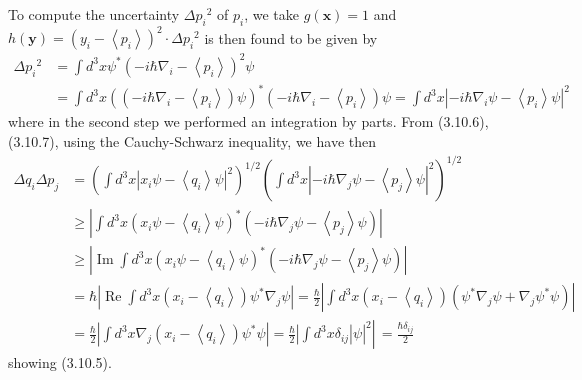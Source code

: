 \documentclass{article}
\begin{document}
To compute the uncertainty $\Delta p_{i}{ }^{2}$ of $p_{i}$, we take $g(\boldsymbol{x})=1$ and $h(\boldsymbol{y})=\left(y_{i}-\left\langle p_{i}\right\rangle\right)^{2} \cdot \Delta p_{i}{ }^{2}$ is then found to be given by
$$
\begin{align*}
\Delta p_{i}{ }^{2} & =\int d^{3} x \psi^{*}\left(-i \hbar \nabla_{i}-\left\langle p_{i}\right\rangle\right)^{2} \psi  \tag{3.10.7}\\
& =\int d^{3} x\left(\left(-i \hbar \nabla_{i}-\left\langle p_{i}\right\rangle\right) \psi\right)^{*}\left(-i \hbar \nabla_{i}-\left\langle p_{i}\right\rangle\right) \psi=\int d^{3} x\left|-i \hbar \nabla_{i} \psi-\left\langle p_{i}\right\rangle \psi\right|^{2}
\end{align*}
$$
where in the second step we performed an integration by parts. From (3.10.6), (3.10.7), using the Cauchy-Schwarz inequality, we have then
$$
\begin{align*}
\Delta q_{i} \Delta p_{j} & =\left(\int d^{3} x\left|x_{i} \psi-\left\langle q_{i}\right\rangle \psi\right|^{2}\right)^{1 / 2}\left(\int d^{3} x\left|-i \hbar \nabla_{j} \psi-\left\langle p_{j}\right\rangle \psi\right|^{2}\right)^{1 / 2}  \tag{3.10.8}\\
& \geq\left|\int d^{3} x\left(x_{i} \psi-\left\langle q_{i}\right\rangle \psi\right)^{*}\left(-i \hbar \nabla_{j} \psi-\left\langle p_{j}\right\rangle \psi\right)\right| \\
& \geq\left|\operatorname{Im} \int d^{3} x\left(x_{i} \psi-\left\langle q_{i}\right\rangle \psi\right)^{*}\left(-i \hbar \nabla_{j} \psi-\left\langle p_{j}\right\rangle \psi\right)\right| \\
& =\hbar\left|\operatorname{Re} \int d^{3} x\left(x_{i}-\left\langle q_{i}\right\rangle\right) \psi^{*} \nabla_{j} \psi\right|=\frac{\hbar}{2}\left|\int d^{3} x\left(x_{i}-\left\langle q_{i}\right\rangle\right)\left(\psi^{*} \nabla_{j} \psi+\nabla_{j} \psi^{*} \psi\right)\right| \\
& \left.=\frac{\hbar}{2}\left|\int d^{3} x \nabla_{j}\left(x_{i}-\left\langle q_{i}\right\rangle\right) \psi^{*} \psi\right|=\left.\frac{\hbar}{2}\left|\int d^{3} x \delta_{i j}\right| \psi\right|^{2} \right\rvert\,=\frac{\hbar \delta_{i j}}{2}
\end{align*}
$$
showing (3.10.5).
\end{document}
